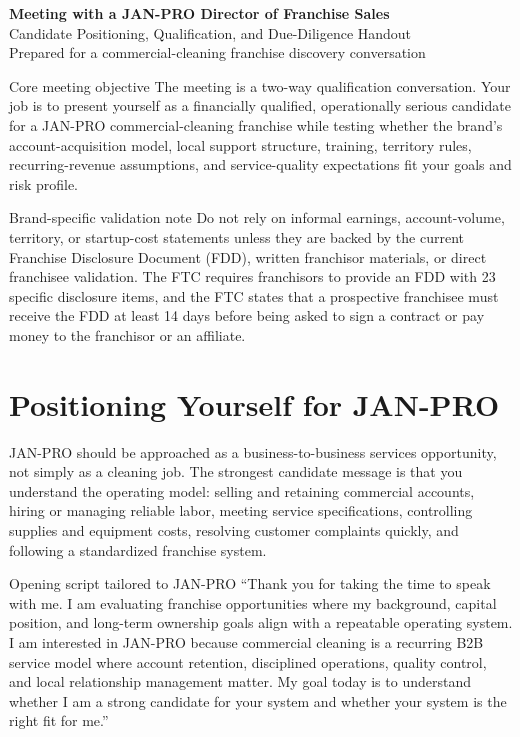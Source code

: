\documentclass[11pt]{article}
\newcommand{\janpro}{JAN-PRO}
\begin{document}
\begin{center}
  {\LARGE\bfseries Meeting with a \janpro{} Director of Franchise Sales}\\[0.35em]
  {\large Candidate Positioning, Qualification, and Due-Diligence Handout}\\[0.4em]
  {\small Prepared for a commercial-cleaning franchise discovery conversation}
\end{center}

\vspace{0.5em}

\begin{keybox}{Core meeting objective}
The meeting is a two-way qualification conversation. Your job is to present yourself as a financially qualified, operationally serious candidate for a \janpro{} commercial-cleaning franchise while testing whether the brand's account-acquisition model, local support structure, training, territory rules, recurring-revenue assumptions, and service-quality expectations fit your goals and risk profile.
\end{keybox}

\begin{warningbox}{Brand-specific validation note}
Do not rely on informal earnings, account-volume, territory, or startup-cost statements unless they are backed by the current Franchise Disclosure Document (FDD), written franchisor materials, or direct franchisee validation. The FTC requires franchisors to provide an FDD with 23 specific disclosure items, and the FTC states that a prospective franchisee must receive the FDD at least 14 days before being asked to sign a contract or pay money to the franchisor or an affiliate.\cite{ftc-rule,ftc-consumer-guide,ftc-deep-dive}
\end{warningbox}

\section{Positioning Yourself for \janpro{}}

\janpro{} should be approached as a business-to-business services opportunity, not simply as a cleaning job. The strongest candidate message is that you understand the operating model: selling and retaining commercial accounts, hiring or managing reliable labor, meeting service specifications, controlling supplies and equipment costs, resolving customer complaints quickly, and following a standardized franchise system.

\begin{scriptbox}{Opening script tailored to \janpro{}}
``Thank you for taking the time to speak with me. I am evaluating franchise opportunities where my background, capital position, and long-term ownership goals align with a repeatable operating system. I am interested in \janpro{} because commercial cleaning is a recurring B2B service model where account retention, disciplined operations, quality control, and local relationship management matter. My goal today is to understand whether I am a strong candidate for your system and whether your system is the right fit for me.''
\end{scriptbox}
\end{document}
